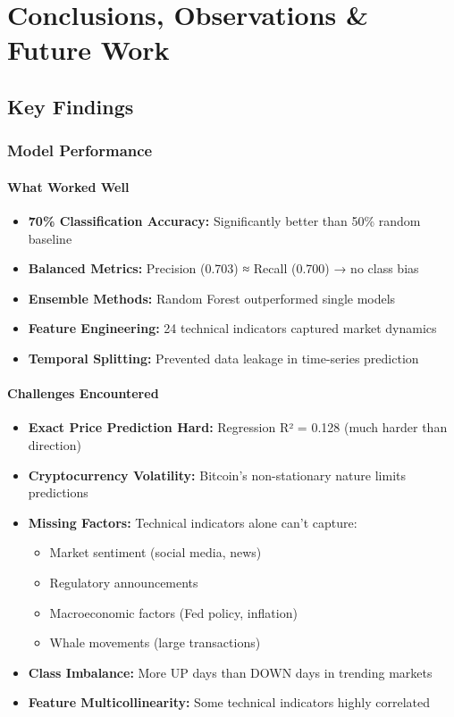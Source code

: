 \chapter{Conclusions, Observations \& Future Work}
\label{ch:conclusions}

\section{Key Findings}

\subsection{Model Performance}

\subsubsection{What Worked Well}
\begin{itemize}
    \item \textbf{70\% Classification Accuracy:} Significantly better than 50\% random baseline
    \item \textbf{Balanced Metrics:} Precision (0.703) ≈ Recall (0.700) → no class bias
    \item \textbf{Ensemble Methods:} Random Forest outperformed single models
    \item \textbf{Feature Engineering:} 24 technical indicators captured market dynamics
    \item \textbf{Temporal Splitting:} Prevented data leakage in time-series prediction
\end{itemize}

\subsubsection{Challenges Encountered}
\begin{itemize}
    \item \textbf{Exact Price Prediction Hard:} Regression R² = 0.128 (much harder than direction)
    \item \textbf{Cryptocurrency Volatility:} Bitcoin's non-stationary nature limits predictions
    \item \textbf{Missing Factors:} Technical indicators alone can't capture:
    \begin{itemize}
        \item Market sentiment (social media, news)
        \item Regulatory announcements
        \item Macroeconomic factors (Fed policy, inflation)
        \item Whale movements (large transactions)
    \end{itemize}
    \item \textbf{Class Imbalance:} More UP days than DOWN days in trending markets
    \item \textbf{Feature Multicollinearity:} Some technical indicators highly correlated
\end{itemize}

